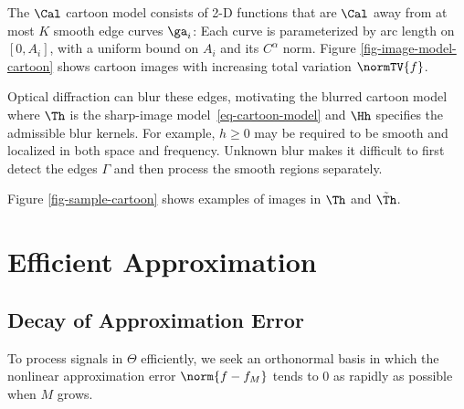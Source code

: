 The $\Cal$ cartoon model consists of 2-D functions that are $\Cal$ away from at most $K$ smooth edge curves $\ga_i$:
Each curve is parameterized by arc length on $[0,A_i]$, with a uniform bound on $A_i$ and its $C^\alpha$ norm.
Figure \ref{fig-image-model-cartoon} shows cartoon images with increasing total variation $\normTV{f}$.


Optical diffraction can blur these edges, motivating the blurred cartoon model
where $\Th$ is the sharp-image model~\eqref{eq-cartoon-model} and $\Hh$ specifies the admissible blur kernels. For example, $h \geq 0$ may be required to be smooth and localized in both space and frequency.
Unknown blur makes it difficult to first detect the edges $\Gamma$ and then process the smooth regions separately.

Figure \ref{fig-sample-cartoon} shows examples of images in $\Th$ and $\tilde\Th$.





                                           
\section{Efficient Approximation}

                                        
\subsection{Decay of Approximation Error}
\label{sec-linear-approx-error}

To process signals in $\Theta$ efficiently, we seek an orthonormal basis in which the nonlinear approximation error $\norm{f-f_M}$ tends to $0$ as rapidly as possible when $M$ grows.


